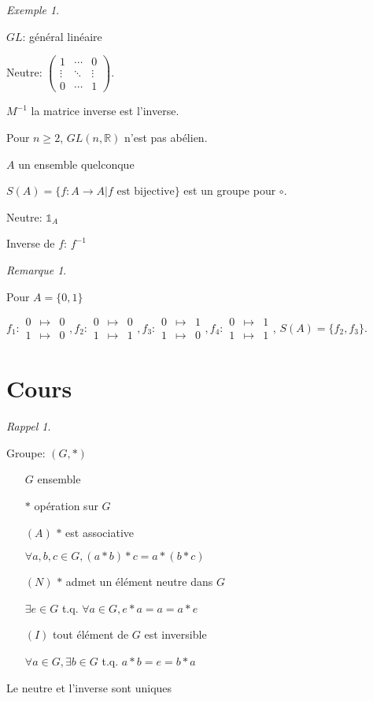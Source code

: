 \documentclass{report}
\newcounter{cours}
\newcommand*{\cours}{\section*{Cours \thecours}\stepcounter{cours}}
\newcommand*{\gte}{\geqslant}
\newcommand*{\reels}{\mathbb{R}}
\theoremstyle{definition}
\theoremstyle{remark}
\newtheorem*{exem}{Exemple}
\newtheorem*{rema}{Remarque}
\newtheorem*{rappel}{Rappel}
\begin{document}
\begin{exem}
\begin{nlist}[resume]
			$GL$: g\'en\'eral lin\'eaire

			Neutre: $\left( \begin{array}{ccc}
				1&\dotsb&0\\
				\vdots&\ddots&\vdots\\
				0&\dotsb&1
			\end{array} \right)$.

			$M^{-1}$ la matrice inverse est l'inverse.

			Pour $n \gte 2$, $GL(n,\reels)$  n'est pas ab\'elien.
			\item $A$ un ensemble quelconque

			$S(A)=\{f:A \to A|f \text{ est bijective}\}$ est un groupe pour $\circ$.

			Neutre: $\mathds{1}_A$

			Inverse de $f$: $f^{-1}$
		\end{nlist}
	\end{exem}
	\begin{rema}
		~

		Pour $A=\{0,1\}$

		$f_1:\begin{array}{rcl}
			0&\mapsto&0\\
			1&\mapsto&0
		\end{array},f_2:\begin{array}{rcl}
			0&\mapsto&0\\
			1&\mapsto&1
		\end{array},f_3:\begin{array}{rcl}
			0&\mapsto&1\\
			1&\mapsto&0
		\end{array},f_4:\begin{array}{rcl}
			0&\mapsto&1\\
			1&\mapsto&1
		\end{array}$, $S(A)=\{f_2,f_3\}$.
	\end{rema}

	\cours
	\begin{rappel}
		~

		\begin{ulist}[noitemsep]
			\item Groupe: $(G,*)$
			\begin{itemize}
				\item[$G$] ensemble
				\item[$*$] op\'eration sur $G$
				\item[$(A)$] $*$ est associative

				$\forall a,b,c \in G, (a*b)*c=a*(b*c)$
				\item[$(N)$] $*$ admet un \'el\'ement neutre dans $G$

				$\exists e \in G$ t.q. $\forall a \in G, e*a=a=a*e$
				\item[$(I)$] tout \'el\'ement de $G$ est inversible

				$\forall a \in G, \exists b \in G$ t.q. $a*b=e=b*a$
			\end{itemize}
			\item Le neutre et l'inverse sont uniques
		\end{ulist}
	\end{rappel}
\end{document}
